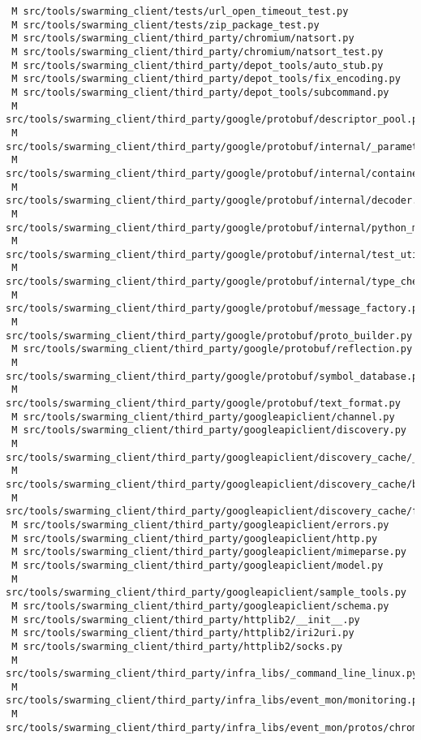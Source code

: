\documentclass{article}
\begin{document}
\begin{verbatim}
 M src/tools/swarming_client/tests/url_open_timeout_test.py
 M src/tools/swarming_client/tests/zip_package_test.py
 M src/tools/swarming_client/third_party/chromium/natsort.py
 M src/tools/swarming_client/third_party/chromium/natsort_test.py
 M src/tools/swarming_client/third_party/depot_tools/auto_stub.py
 M src/tools/swarming_client/third_party/depot_tools/fix_encoding.py
 M src/tools/swarming_client/third_party/depot_tools/subcommand.py
 M src/tools/swarming_client/third_party/google/protobuf/descriptor_pool.py
 M src/tools/swarming_client/third_party/google/protobuf/internal/_parameterized.py
 M src/tools/swarming_client/third_party/google/protobuf/internal/containers.py
 M src/tools/swarming_client/third_party/google/protobuf/internal/decoder.py
 M src/tools/swarming_client/third_party/google/protobuf/internal/python_message.py
 M src/tools/swarming_client/third_party/google/protobuf/internal/test_util.py
 M src/tools/swarming_client/third_party/google/protobuf/internal/type_checkers.py
 M src/tools/swarming_client/third_party/google/protobuf/message_factory.py
 M src/tools/swarming_client/third_party/google/protobuf/proto_builder.py
 M src/tools/swarming_client/third_party/google/protobuf/reflection.py
 M src/tools/swarming_client/third_party/google/protobuf/symbol_database.py
 M src/tools/swarming_client/third_party/google/protobuf/text_format.py
 M src/tools/swarming_client/third_party/googleapiclient/channel.py
 M src/tools/swarming_client/third_party/googleapiclient/discovery.py
 M src/tools/swarming_client/third_party/googleapiclient/discovery_cache/__init__.py
 M src/tools/swarming_client/third_party/googleapiclient/discovery_cache/base.py
 M src/tools/swarming_client/third_party/googleapiclient/discovery_cache/file_cache.py
 M src/tools/swarming_client/third_party/googleapiclient/errors.py
 M src/tools/swarming_client/third_party/googleapiclient/http.py
 M src/tools/swarming_client/third_party/googleapiclient/mimeparse.py
 M src/tools/swarming_client/third_party/googleapiclient/model.py
 M src/tools/swarming_client/third_party/googleapiclient/sample_tools.py
 M src/tools/swarming_client/third_party/googleapiclient/schema.py
 M src/tools/swarming_client/third_party/httplib2/__init__.py
 M src/tools/swarming_client/third_party/httplib2/iri2uri.py
 M src/tools/swarming_client/third_party/httplib2/socks.py
 M src/tools/swarming_client/third_party/infra_libs/_command_line_linux.py
 M src/tools/swarming_client/third_party/infra_libs/event_mon/monitoring.py
 M src/tools/swarming_client/third_party/infra_libs/event_mon/protos/chrome_infra_log_pb2.py

\end{verbatim}
\end{document}
